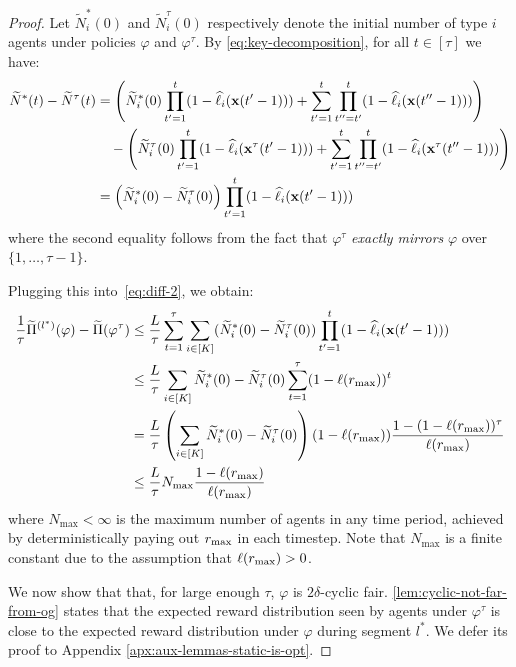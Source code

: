 \documentclass[12pt]{article}
\begin{document}
\begin{proof}
Let $\widetilde{N}_i^*(0)$ and $\widetilde{N}_i^\tau(0)$ respectively denote the initial number of type $i$ agents under policies $\varphi$ and ${\varphi}^\tau$. By \eqref{eq:key-decomposition}, for all $t\in[\tau]$ we have:
\begin{align*}
    \widetilde{N}^*(t)-\widetilde{N}^\tau(t) &= \left(\widetilde{N}_i^*(0) \prod_{t'=1}^t (1-\widehat{\ell}_i(\mathbf{x}(t'-1))) + \sum_{t'=1}^t \prod_{t''=t'}^t (1-\widehat{\ell}_i(\mathbf{x}(t''-1)))\right)\\
    &\quad- \left(\widetilde{N}_i^\tau(0) \prod_{t'=1}^t (1-\widehat{\ell}_i(\mathbf{x}^\tau(t'-1))) + \sum_{t'=1}^t \prod_{t''=t'}^t (1-\widehat{\ell}_i(\mathbf{x}^\tau(t''-1)))\right) \\
    &= \left(\widetilde{N}_i^*(0)-\widetilde{N}_i^\tau(0)\right) \prod_{t'=1}^t (1-\widehat{\ell}_i(\mathbf{x}(t'-1)))
\end{align*}
where the second equality follows from the fact that $\varphi^\tau$ {\it exactly mirrors} $\varphi$ over $\{1,\ldots,\tau-1\}$.



Plugging this into~\eqref{eq:diff-2}, we obtain:
\begin{align*}
    \frac1\tau\widetilde{\Pi}^{(l^*)}(\varphi)-\widetilde{\Pi}({\varphi}^\tau) &\leq \frac{L}{\tau} \sum_{t=1}^{\tau} \sum_{i\in[K]}(\widetilde{N}_i^*(0)-\widetilde{N}_i^\tau(0))\prod_{t'=1}^t (1-\widehat{\ell}_i(\mathbf{x}(t'-1))) \\
    &\leq \frac{L}{\tau}\sum_{i\in[K]}\widetilde{N}_i^*(0)-\widetilde{N}_i^\tau(0)\sum_{t=1}^{\tau} (1-\ell({r_{\max}}))^t \\
    &= \frac{L}{\tau}\left(\sum_{i\in[K]}\widetilde{N}_i^*(0)-\widetilde{N}_i^\tau(0)\right)(1-\ell({r_{\max}}))\frac{1-(1-\ell({r_{\max}}))^{\tau}}{\ell({r_{\max}})} \\
    &\leq \frac{L}{\tau}N_{\max}\frac{1-\ell({r_{\max}})}{\ell({r_{\max}})}
\end{align*}
where $N_{\max} < \infty$ is the maximum number of agents in any time period, achieved by deterministically paying out $r_{\max}$ in each timestep. Note that $N_{\max}$ is a finite constant due to the assumption that $\ell({r_{\max}}) > 0$.

We now show that that, for large enough $\tau$, $\varphi$ is $2\delta$-cyclic fair. 
\cref{lem:cyclic-not-far-from-og} states that the expected reward distribution seen by agents under $\varphi^\tau$ is close to the expected reward distribution under $\varphi$ during segment $l^*$. We defer its proof to Appendix \ref{apx:aux-lemmas-static-is-opt}.


\end{proof}
\end{document}
